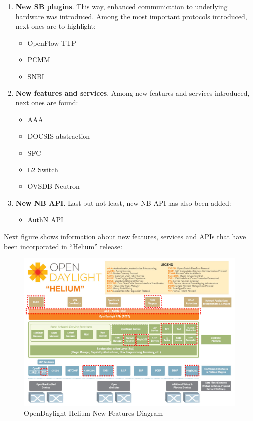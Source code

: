 \documentclass[a4paper, 12pt]{book}
\begin{document}
\begin{enumerate}\itemsep0pt
\item{\textbf{New SB plugins}}. This way, enhanced communication to underlying hardware was introduced. Among the most important protocols introduced, next ones are to highlight:
\begin{itemize}\itemsep0pt
\item{OpenFlow TTP}
\item{PCMM}
\item{SNBI}
\end{itemize}
\item{\textbf{New features and services}}. Among new features and services introduced, next ones are found:
\begin{itemize}\itemsep0pt
\item{AAA}
\item{DOCSIS abstraction}
\item{SFC}
\item{L2 Switch}
\item{OVSDB Neutron}
\end{itemize}
\item{\textbf{New NB API}}. Last but not least, new NB API has also been added:
\begin{itemize}\itemsep0pt
\item{AuthN API}
\end{itemize}
\end{enumerate}
Next figure shows information about new features, services and APIs that have been incorporated in ``Helium'' release:
\begin{center}
 \begin{figure}[H]
 \begin{center}
   \includegraphics[width=15cm]{img/odl-technologies-02.png}
   \caption{OpenDaylight Helium New Features Diagram}
   \label{fig:odl_tech_helium_new_diagram}
 \end{center}
 \end{figure}
\end{center}
\end{document}
